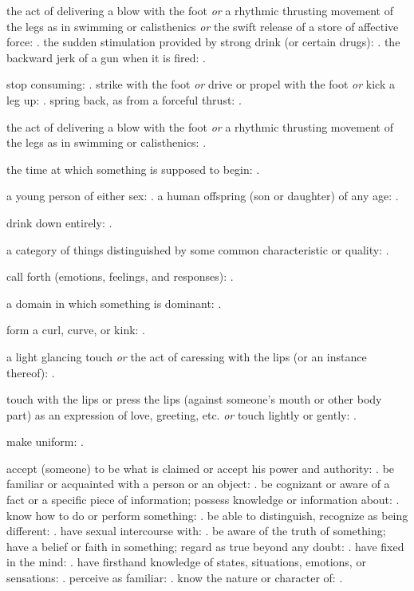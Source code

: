   the act of delivering a blow with the foot \textit{or} a rhythmic thrusting movement of the legs as in swimming or calisthenics \textit{or} the swift release of a store of affective force: . the sudden stimulation provided by strong drink (or certain drugs): . the backward jerk of a gun when it is fired: .

  stop consuming: . strike with the foot \textit{or} drive or propel with the foot \textit{or} kick a leg up: . spring back, as from a forceful thrust: .

  the act of delivering a blow with the foot \textit{or} a rhythmic thrusting movement of the legs as in swimming or calisthenics: .

  the time at which something is supposed to begin: .

  a young person of either sex: . a human offspring (son or daughter) of any age: .

  drink down entirely: .

  a category of things distinguished by some common characteristic or quality: .

  call forth (emotions, feelings, and responses): .

  a domain in which something is dominant: .

  form a curl, curve, or kink: .

  a light glancing touch \textit{or} the act of caressing with the lips (or an instance thereof): .

  touch with the lips or press the lips (against someone's mouth or other body part) as an expression of love, greeting, etc. \textit{or} touch lightly or gently: .

  make uniform: .

  accept (someone) to be what is claimed or accept his power and authority: . be familiar or acquainted with a person or an object: . be cognizant or aware of a fact or a specific piece of information; possess knowledge or information about: . know how to do or perform something: . be able to distinguish, recognize as being different: . have sexual intercourse with: . be aware of the truth of something; have a belief or faith in something; regard as true beyond any doubt: . have fixed in the mind: . have firsthand knowledge of states, situations, emotions, or sensations: . perceive as familiar: . know the nature or character of: .

